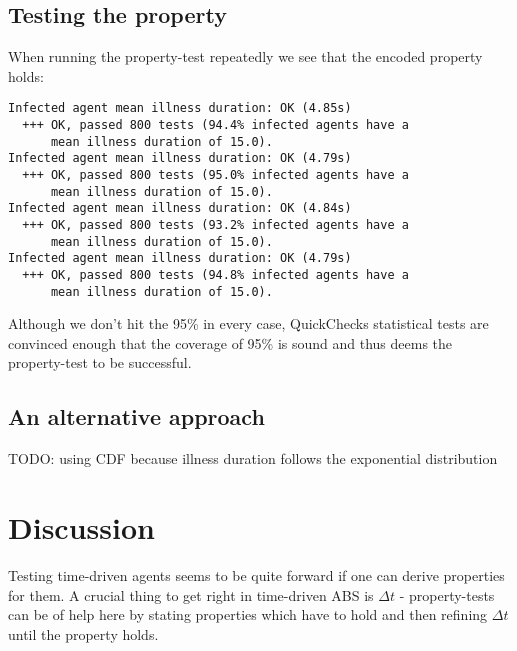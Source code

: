 \subsection{Testing the property}

When running the property-test repeatedly we see that the encoded property holds:

\begin{verbatim}
Infected agent mean illness duration: OK (4.85s)
  +++ OK, passed 800 tests (94.4% infected agents have a 
      mean illness duration of 15.0).
Infected agent mean illness duration: OK (4.79s)
  +++ OK, passed 800 tests (95.0% infected agents have a 
      mean illness duration of 15.0).
Infected agent mean illness duration: OK (4.84s)
  +++ OK, passed 800 tests (93.2% infected agents have a 
      mean illness duration of 15.0).
Infected agent mean illness duration: OK (4.79s)
  +++ OK, passed 800 tests (94.8% infected agents have a 
      mean illness duration of 15.0).
\end{verbatim}

Although we don't hit the 95\% in every case, QuickChecks statistical tests are convinced enough that the coverage of 95\% is sound and thus deems the property-test to be successful.

\subsection{An alternative approach}
TODO: using CDF because illness duration follows the exponential distribution

\section{Discussion}
Testing time-driven agents seems to be quite forward if one can derive properties for them. A crucial thing to get right in time-driven ABS is $\Delta t$ - property-tests can be of help here by stating properties which have to hold and then refining $\Delta t$ until the property holds.